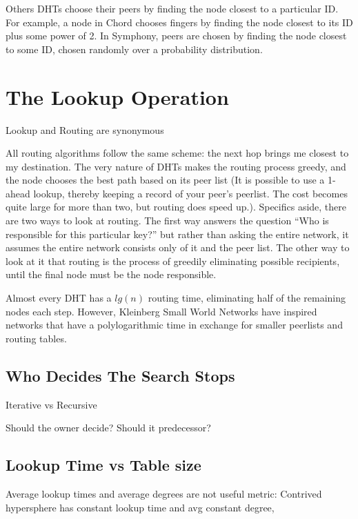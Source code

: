\documentclass[10pt,letterpaper]{report}
\begin{document}
Others DHTs choose their peers by finding the node closest to a particular ID.  For example, a node in Chord chooses fingers by finding the node closest to its ID plus some  power of 2.    In Symphony, peers are chosen by finding the node closest to some ID, chosen randomly over a probability distribution.



\section{The Lookup Operation} 

Lookup and Routing are synonymous

All routing algorithms follow the same scheme:  the next hop  brings me closest to my destination.  The very nature of DHTs makes the routing process greedy, and the node chooses the best path based on its peer list (It is possible to use a 1-ahead lookup, thereby keeping a record of your peer's peerlist.  The cost becomes quite large for more than two, but routing does speed up.).  Specifics aside, there are two ways to look at routing.  The first way  answers the question ``Who is responsible for this particular key?''  but rather than asking the entire network, it assumes the entire network consists only of it and the peer list.  The other way to look at it that routing is the process of greedily  eliminating possible recipients, until the final node must be the node responsible.  

Almost every DHT has a $lg(n)$ routing time, eliminating  half of the remaining nodes each step.
However, Kleinberg Small World Networks have inspired networks that have a polylogarithmic time in exchange for smaller peerlists and routing tables.



\subsection{Who Decides The Search Stops}
Iterative vs Recursive

Should the owner decide?  Should it predecessor?

\subsection{Lookup Time vs Table size}

Average lookup times and average degrees are not useful metric:
Contrived hypersphere has constant lookup time and avg constant degree,
\end{document}
